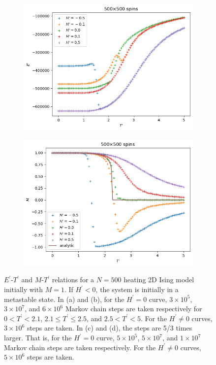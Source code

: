 \documentclass[11pt]{article}
\begin{document}
\begin{figure}[H]
    \begin{subfigure}[H]{0.48\textwidth}
        \centering
        \includegraphics[width=\textwidth]{Meta/energy_N500_steps500000-50000000-10000000_Hsteps5000000.png}
        \caption{}
        \label{meta500El}
    \end{subfigure}
    \hfill
    \begin{subfigure}[H]{0.48\textwidth}
        \centering
        \includegraphics[width=\textwidth]{Meta/magnetization_N500_steps500000-50000000-10000000_Hsteps5000000.png}
        \caption{}
        \label{meta500Ml}
    \end{subfigure}
    \caption{$E^\prime$-$T^\prime$ and $M$-$T^\prime$ relations for a $N = 500$ heating 2D Ising model initially with $M = 1$. If $H^\prime < 0$, the system is initially in a metastable state. In (a) and (b), for the $H^\prime = 0$ curve, $3 \times 10^5$, $3 \times 10^7$, and $6 \times 10^6$ Markov chain steps are taken respectively for $0 < T^\prime < 2.1$, $2.1 \leq T^\prime \leq 2.5$, and $2.5 < T^\prime < 5$. For the $H^\prime \neq 0$ curves, $3 \times 10^6$ steps are taken. In (c) and (d), the steps are 5/3 times larger. That is, for the $H^\prime = 0$ curve, $5 \times 10^5$, $5 \times 10^7$, and $1 \times 10^7$ Markov chain steps are taken respectively. For the $H^\prime \neq 0$ curves, $5 \times 10^6$ steps are taken.}
    \label{fig:meta500}
\end{figure}
\end{document}
